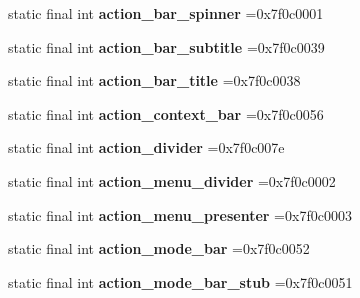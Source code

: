 \begin{DoxyCompactItemize}
\item 
\hypertarget{classcheck_1_1test_1_1_r_1_1id_ad265e89fb3ef62d7c797275597d36ff4}{}static final int {\bfseries action\+\_\+bar\+\_\+spinner} =0x7f0c0001\label{classcheck_1_1test_1_1_r_1_1id_ad265e89fb3ef62d7c797275597d36ff4}

\item 
\hypertarget{classcheck_1_1test_1_1_r_1_1id_ac73ae0c528d97eb14acf721422abd966}{}static final int {\bfseries action\+\_\+bar\+\_\+subtitle} =0x7f0c0039\label{classcheck_1_1test_1_1_r_1_1id_ac73ae0c528d97eb14acf721422abd966}

\item 
\hypertarget{classcheck_1_1test_1_1_r_1_1id_a17d8da35f0e5aaa54c001de6f92e4da1}{}static final int {\bfseries action\+\_\+bar\+\_\+title} =0x7f0c0038\label{classcheck_1_1test_1_1_r_1_1id_a17d8da35f0e5aaa54c001de6f92e4da1}

\item 
\hypertarget{classcheck_1_1test_1_1_r_1_1id_a9a4f53f1d6e37ac859c473af755a1f29}{}static final int {\bfseries action\+\_\+context\+\_\+bar} =0x7f0c0056\label{classcheck_1_1test_1_1_r_1_1id_a9a4f53f1d6e37ac859c473af755a1f29}

\item 
\hypertarget{classcheck_1_1test_1_1_r_1_1id_a3e7365386f87d86201bdf830c2f2b47c}{}static final int {\bfseries action\+\_\+divider} =0x7f0c007e\label{classcheck_1_1test_1_1_r_1_1id_a3e7365386f87d86201bdf830c2f2b47c}

\item 
\hypertarget{classcheck_1_1test_1_1_r_1_1id_a7e45f724f7702831a8dcb26744db6e55}{}static final int {\bfseries action\+\_\+menu\+\_\+divider} =0x7f0c0002\label{classcheck_1_1test_1_1_r_1_1id_a7e45f724f7702831a8dcb26744db6e55}

\item 
\hypertarget{classcheck_1_1test_1_1_r_1_1id_adc149a649fc021aaaa943b1ab56dbc47}{}static final int {\bfseries action\+\_\+menu\+\_\+presenter} =0x7f0c0003\label{classcheck_1_1test_1_1_r_1_1id_adc149a649fc021aaaa943b1ab56dbc47}

\item 
\hypertarget{classcheck_1_1test_1_1_r_1_1id_ac72e0ce691524564014d0a6eb8ed446a}{}static final int {\bfseries action\+\_\+mode\+\_\+bar} =0x7f0c0052\label{classcheck_1_1test_1_1_r_1_1id_ac72e0ce691524564014d0a6eb8ed446a}

\item 
\hypertarget{classcheck_1_1test_1_1_r_1_1id_a482309978a6eaeb75dc7ae48011f7773}{}static final int {\bfseries action\+\_\+mode\+\_\+bar\+\_\+stub} =0x7f0c0051\label{classcheck_1_1test_1_1_r_1_1id_a482309978a6eaeb75dc7ae48011f7773}


\end{DoxyCompactItemize}
